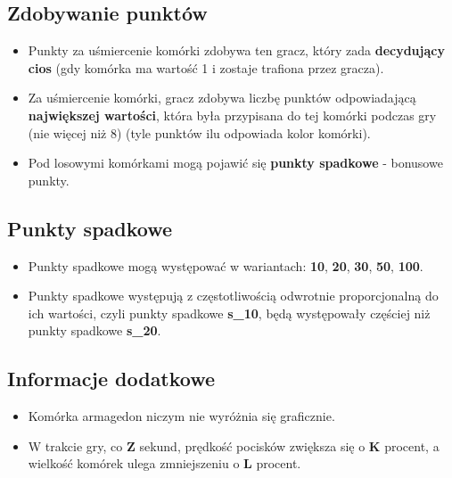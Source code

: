 \documentclass{article}
\begin{document}
\subsection{Zdobywanie punktów}    
\begin{itemize}

    \item Punkty za uśmiercenie komórki zdobywa ten gracz, który zada \textbf{decydujący cios} (gdy komórka ma wartość 1 i zostaje trafiona przez gracza). 
    
    \item Za uśmiercenie komórki, gracz zdobywa liczbę punktów odpowiadającą \textbf{największej wartości}, która była przypisana do tej komórki podczas gry (nie więcej niż 8) (tyle punktów ilu odpowiada kolor komórki). 
    
    \item Pod losowymi komórkami mogą pojawić się \textbf{punkty spadkowe} - bonusowe punkty.
 \end{itemize}  
    
\subsection{Punkty spadkowe}
\begin{itemize}

    \item Punkty spadkowe mogą występować w wariantach: \textbf{10}, \textbf{20}, \textbf{30}, \textbf{50}, \textbf{100}. 

    \item Punkty spadkowe występują z częstotliwością odwrotnie proporcjonalną do ich wartości, czyli punkty spadkowe \textbf{s\_10}, będą występowały częściej niż punkty spadkowe \textbf{s\_20}.

 \end{itemize}  
    
\subsection{Informacje dodatkowe}  
\begin{itemize}
    \item Komórka armagedon niczym nie wyróżnia się graficznie.
    
    \item W trakcie gry, co \textbf{Z} sekund, prędkość pocisków zwiększa się o \textbf{K} procent, a wielkość komórek ulega zmniejszeniu o \textbf{L} procent.
 \end{itemize}  
 
\end{document}
